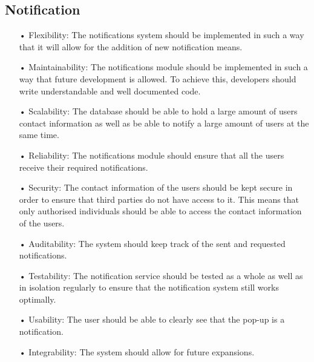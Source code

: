 \documentclass[runningheads,a4paper]{article}
\begin{document}
\subsection{Notification}
\begin{enumerate}

\item[•]Flexibility: The notifications system should be implemented in such a way that it will allow for the addition of new notification means.

\item[•]Maintainability: The notifications module should be implemented in such a way that future development is allowed. To achieve this, developers should write understandable and well documented code.
 
\item[•]Scalability: The database should be able to hold a large amount of users contact information as well as be able to notify a large amount of users at the same time.

\item[•]Reliability: The notifications module should ensure that all the users receive their required notifications.

\item[•]Security: The contact information of the users should be kept secure in order to ensure that third parties do not have access to it. This means that only authorised individuals should be able to access the contact information of the users.

\item[•]Auditability: The system should keep track of the sent and requested notifications.

\item[•]Testability: The notification service should be tested as a whole as well as in isolation regularly to ensure that the notification system still works optimally.

\item[•]Usability: The user should be able to clearly see that the pop-up is a notification.

\item[•]Integrability: The system should allow for future expansions.


\end{enumerate}
\end{document}
